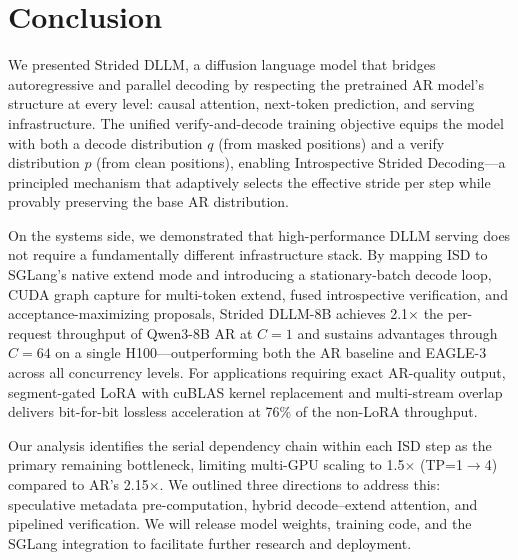 \section{Conclusion}
\label{sec:conclusion}

We presented Strided DLLM, a diffusion language model that bridges autoregressive and parallel decoding by respecting the pretrained AR model's structure at every level: causal attention, next-token prediction, and serving infrastructure. The unified verify-and-decode training objective equips the model with both a decode distribution $q$ (from masked positions) and a verify distribution $p$ (from clean positions), enabling Introspective Strided Decoding---a principled mechanism that adaptively selects the effective stride per step while provably preserving the base AR distribution.

On the systems side, we demonstrated that high-performance DLLM serving does not require a fundamentally different infrastructure stack. By mapping ISD to SGLang's native extend mode and introducing a stationary-batch decode loop, CUDA graph capture for multi-token extend, fused introspective verification, and acceptance-maximizing proposals, Strided DLLM-8B achieves 2.1$\times$ the per-request throughput of Qwen3-8B AR at $C{=}1$ and sustains advantages through $C{=}64$ on a single H100---outperforming both the AR baseline and EAGLE-3 across all concurrency levels. For applications requiring exact AR-quality output, segment-gated LoRA with cuBLAS kernel replacement and multi-stream overlap delivers bit-for-bit lossless acceleration at 76\% of the non-LoRA throughput.

Our analysis identifies the serial dependency chain within each ISD step as the primary remaining bottleneck, limiting multi-GPU scaling to 1.5$\times$ (TP=1$\to$4) compared to AR's 2.15$\times$. We outlined three directions to address this: speculative metadata pre-computation, hybrid decode--extend attention, and pipelined verification. We will release model weights, training code, and the SGLang integration to facilitate further research and deployment.
